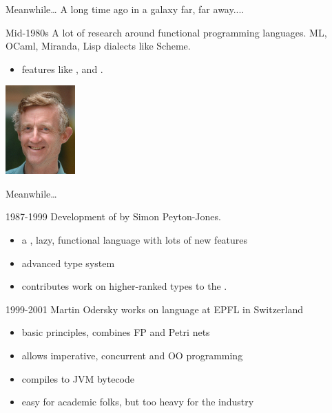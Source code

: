 \begin{frame}{Meanwhile\ldots}
A long time ago in a galaxy far, far away....
\begin{block}{Mid-1980s}
A lot of research around functional programming languages. ML, OCaml, Miranda,
Lisp dialects like Scheme.
\begin{itemize}
  \item features like , 
  and .
\end{itemize}
\end{block}
\pause
\begin{center}
\includegraphics[width=0.2\textwidth]{resources/SimonPeytonJones.jpg}
\end{center}
\end{frame}

\begin{frame}{Meanwhile\ldots}
\begin{block}{1987-1999}
Development of  by Simon Peyton-Jones.
\begin{itemize}
  \item a , lazy, functional language with lots of new features
  \item advanced type system
  \item {} contributes work on higher-ranked types to
  the .
\end{itemize}
\end{block}
\pause
\begin{block}{1999-2001}
Martin Odersky works on  language at EPFL in Switzerland
\begin{itemize}
  \item basic principles, combines FP and Petri nets
  \item allows imperative, concurrent and OO programming
  \item compiles to JVM bytecode
  \item \alert{easy for academic folks, but too heavy for the industry}
\end{itemize}
\end{block}
\end{frame}

